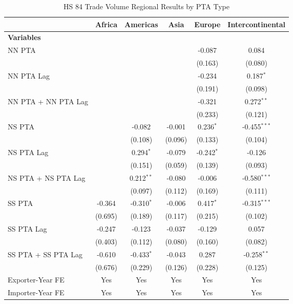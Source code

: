\begin{table}[htbp]
    \centering
    \caption{HS 84 Trade Volume Regional Results by PTA Type}
    \label{tab:84_trade_pta_types}
    \begin{adjustbox}{max width=\textwidth}
    \begin{tabular}{lccccc}
    \hline
     & \multicolumn{1}{c}{Africa} & \multicolumn{1}{c}{Americas} & \multicolumn{1}{c}{Asia} & \multicolumn{1}{c}{Europe} & \multicolumn{1}{c}{Intercontinental} \\
    \hline
    \textbf{Variables} &  &  &  &  &  \\
    \hline
    NN PTA &  &  &  & -0.087 & 0.084 \\
     &  &  &  & (0.163) & (0.080) \\
    NN PTA Lag &  &  &  & -0.234 & 0.187$^{\ast}$ \\
     &  &  &  & (0.191) & (0.098) \\
    NN PTA + NN PTA Lag &  &  &  & -0.321 & 0.272$^{\ast\ast}$ \\
     &  &  &  & (0.233) & (0.121) \\
    \hline
    NS PTA &  & -0.082 & -0.001 & 0.236$^{\ast}$ & -0.455$^{\ast\ast\ast}$ \\
     &  & (0.108) & (0.096) & (0.133) & (0.104) \\
    NS PTA Lag &  & 0.294$^{\ast}$ & -0.079 & -0.242$^{\ast}$ & -0.126 \\
     &  & (0.151) & (0.059) & (0.139) & (0.093) \\
    NS PTA + NS PTA Lag &  & 0.212$^{\ast\ast}$ & -0.080 & -0.006 & -0.580$^{\ast\ast\ast}$ \\
     &  & (0.097) & (0.112) & (0.169) & (0.111) \\
    \hline
    SS PTA & -0.364 & -0.310$^{\ast}$ & -0.006 & 0.417$^{\ast}$ & -0.315$^{\ast\ast\ast}$ \\
     & (0.695) & (0.189) & (0.117) & (0.215) & (0.102) \\
    SS PTA Lag & -0.247 & -0.123 & -0.037 & -0.129 & 0.057 \\
     & (0.403) & (0.112) & (0.080) & (0.160) & (0.082) \\
    SS PTA + SS PTA Lag & -0.610 & -0.433$^{\ast}$ & -0.043 & 0.287 & -0.258$^{\ast\ast}$ \\
     & (0.676) & (0.229) & (0.126) & (0.228) & (0.125) \\
    \hline
    Exporter-Year FE & Yes & Yes & Yes & Yes & Yes \\
    Importer-Year FE & Yes & Yes & Yes & Yes & Yes \\

\end{tabular}
\end{adjustbox}
\end{table}
